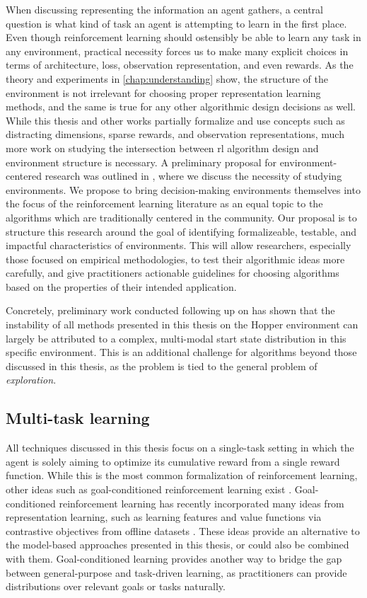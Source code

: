 When discussing representing the information an agent gathers, a central question is what kind of task an agent is attempting to learn in the first place.
Even though reinforcement learning should ostensibly be able to learn any task in any environment, practical necessity forces us to make many explicit choices in terms of architecture, loss, observation representation, and even rewards.
As the theory and experiments in \autoref{chap:understanding} show, the structure of the environment is not irrelevant for choosing proper representation learning methods, and the same is true for any other algorithmic design decisions as well.
While this thesis and other works partially formalize and use concepts such as distracting dimensions, sparse rewards, and observation representations, much more work on studying the intersection between \ac{rl} algorithm design and environment structure is necessary.
A preliminary proposal for environment-centered research was outlined in \textcite{voelcker2024can}, where we discuss the necessity of studying environments.
We propose to bring decision-making environments themselves into the focus of the reinforcement learning literature as an equal topic to the algorithms which are traditionally centered in the community.
Our proposal is to structure this research around the goal of identifying formalizeable, testable, and impactful characteristics of environments.
This will allow researchers, especially those focused on empirical methodologies, to test their algorithmic ideas more carefully, and give practitioners actionable guidelines for choosing algorithms based on the properties of their intended application.

Concretely, preliminary work conducted following up on \textcite{voelcker2024can} has shown that the instability of all methods presented in this thesis on the Hopper environment can largely be attributed to a complex, multi-modal start state distribution in this specific environment.
This is an additional challenge for algorithms beyond those discussed in this thesis, as the problem is tied to the general problem of \emph{exploration}.

\subsection{Multi-task learning}

All techniques discussed in this thesis focus on a single-task setting in which the agent is solely aiming to optimize its cumulative reward from a single reward function.
While this is the most common formalization of reinforcement learning, other ideas such as goal-conditioned reinforcement learning exist \parencite{kaelbling1993learning,schaul2015universal}.
Goal-con\-ditioned reinforcement learning has recently incorporated many ideas from representation learning, such as learning features and value functions via contrastive objectives from offline datasets \parencite{eysenbach2022contrastive}.
These ideas provide an alternative to the model-based approaches presented in this thesis, or could also be combined with them.
Goal-conditioned learning provides another way to bridge the gap between general-purpose and task-driven learning, as practitioners can provide distributions over relevant goals or tasks naturally.

